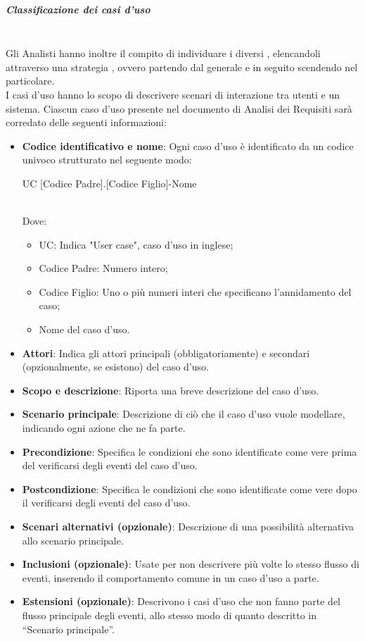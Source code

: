     
    \subparagraph{Classificazione dei casi d'uso}
    ~\\
    Gli Analisti hanno inoltre il compito di individuare i diversi , elencandoli attraverso una strategia , ovvero partendo dal generale e in seguito scendendo nel particolare. \\
    I casi d'uso hanno lo scopo di descrivere scenari di interazione tra utenti e un sistema. Ciascun caso d'uso presente nel documento di Analisi dei Requisiti sarà corredato delle seguenti informazioni:
        \begin{itemize}
            \item \textbf{Codice identificativo e nome}: Ogni caso d'uso è identificato da un codice univoco strutturato nel seguente modo:
                \begin{center}
                    UC [Codice Padre].[Codice Figlio]-Nome
                \end{center} 
                \\
                Dove:
                    \begin{itemize}
                        \item UC: Indica "User case", caso d'uso in inglese;
                        \item Codice Padre: Numero intero;
                        \item Codice Figlio: Uno o più numeri interi che specificano l'annidamento del caso;
                        \item Nome del caso d'uso.
                    \end{itemize}
                    
            \item \textbf{Attori}: Indica gli attori principali (obbligatoriamente) e secondari (opzionalmente, se esistono) del caso d'uso.
            \item \textbf{Scopo e descrizione}: Riporta una breve descrizione del caso d’uso.
            \item \textbf{Scenario principale}: Descrizione  di ciò che il caso d’uso vuole modellare, indicando ogni azione che ne fa parte.
            \item \textbf{Precondizione}: Specifica le condizioni che sono identificate come vere prima del verificarsi degli eventi del caso d’uso.
            \item \textbf{Postcondizione}: Specifica le condizioni che sono identificate come vere dopo il verificarsi degli eventi del caso d’uso.
            \item \textbf{Scenari alternativi (opzionale)}: Descrizione di una possibilità alternativa allo scenario principale.
            \item \textbf{Inclusioni (opzionale)}: Usate per non descrivere più volte lo stesso flusso di eventi, inserendo il comportamento comune in un caso d’uso a parte.
            \item \textbf{Estensioni (opzionale)}: Descrivono i casi d’uso che non  fanno parte del flusso principale degli eventi, allo stesso modo di quanto  descritto in “Scenario principale”.
        \end{itemize}
